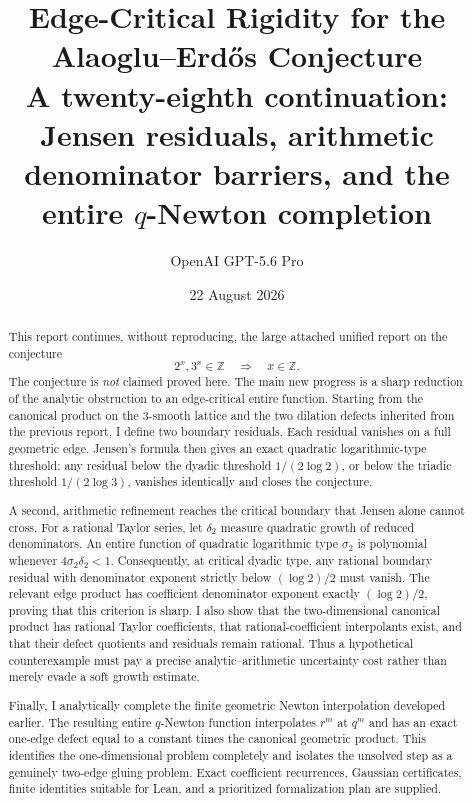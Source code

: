 \documentclass[11pt]{article}
\title{\textbf{Edge-Critical Rigidity for the Alaoglu--Erd\H{o}s Conjecture}\\[0.35em]
\large A twenty-eighth continuation: Jensen residuals, arithmetic denominator barriers, and the entire \(q\)-Newton completion}
\author{OpenAI GPT-5.6 Pro}
\date{22 August 2026}
\theoremstyle{definition}
\newcommand{\Z}{\mathbb Z}
\begin{document}
\maketitle

\begin{abstract}
This report continues, without reproducing, the large attached unified report on the conjecture
\[
  2^x,3^x\in\Z \quad\Longrightarrow\quad x\in\Z.
\]
The conjecture is \emph{not} claimed proved here.  The main new progress is a sharp reduction of the analytic obstruction to an edge-critical entire function.  Starting from the canonical product on the \(3\)-smooth lattice and the two dilation defects inherited from the previous report, I define two boundary residuals.  Each residual vanishes on a full geometric edge.  Jensen's formula then gives an exact quadratic logarithmic-type threshold: any residual below the dyadic threshold \(1/(2\log 2)\), or below the triadic threshold \(1/(2\log 3)\), vanishes identically and closes the conjecture.

A second, arithmetic refinement reaches the critical boundary that Jensen alone cannot cross.  For a rational Taylor series, let \(\delta_2\) measure quadratic growth of reduced denominators.  An entire function of quadratic logarithmic type \(\sigma_2\) is polynomial whenever \(4\sigma_2\delta_2<1\).  Consequently, at critical dyadic type, any rational boundary residual with denominator exponent strictly below \((\log 2)/2\) must vanish.  The relevant edge product has coefficient denominator exponent exactly \((\log 2)/2\), proving that this criterion is sharp.  I also show that the two-dimensional canonical product has rational Taylor coefficients, that rational-coefficient interpolants exist, and that their defect quotients and residuals remain rational.  Thus a hypothetical counterexample must pay a precise analytic--arithmetic uncertainty cost rather than merely evade a soft growth estimate.

Finally, I analytically complete the finite geometric Newton interpolation developed earlier.  The resulting entire \(q\)-Newton function interpolates \(r^m\) at \(q^m\) and has an exact one-edge defect equal to a constant times the canonical geometric product.  This identifies the one-dimensional problem completely and isolates the unsolved step as a genuinely two-edge gluing problem.  Exact coefficient recurrences, Gaussian certificates, finite identities suitable for Lean, and a prioritized formalization plan are supplied.
\end{abstract}
\end{document}
